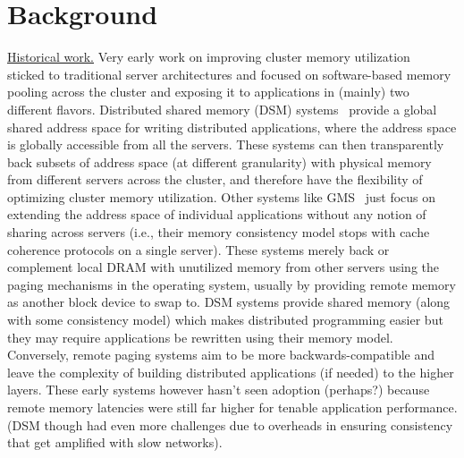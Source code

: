 \section{Background}
\label{sec:background}

\vspace{5pt}
\noindent \uline{Historical work.}
Very early work on improving cluster memory 
utilization ~\cite{gms,cashmere,treadmarks,dsm1} 
sticked to traditional server architectures and focused on 
software-based memory pooling across the cluster and exposing it 
to applications in (mainly) two different flavors. 
Distributed shared memory (DSM) systems~\cite{treadmarks,dsm1} 
provide a global shared address space for writing distributed 
applications, where the address space is globally accessible 
from all the servers. These systems can then transparently 
back subsets of address space (at different granularity) with 
physical memory from different servers across the cluster, and 
therefore have the flexibility of optimizing cluster memory 
utilization. Other systems like GMS~\cite{gms, cashmere} just 
focus on extending the address space of individual applications 
without any notion of sharing across servers (i.e., their memory 
consistency model stops with cache coherence protocols on a single 
server). These systems merely back or complement local DRAM with 
unutilized memory from other servers using the paging mechanisms 
in the operating system, usually by providing remote memory as 
another block device to swap to. DSM systems 
provide shared memory (along with some consistency model) which 
makes distributed programming easier but they may require 
applications be rewritten using their memory model. Conversely, 
remote paging systems aim to be more backwards-compatible and 
leave the complexity of building distributed applications 
(if needed) to the higher layers. These early systems however 
hasn't seen adoption (perhaps?) because remote memory latencies 
were still far higher for tenable application performance. 
(DSM though had even more challenges due to overheads in 
ensuring consistency that get amplified with slow networks).

